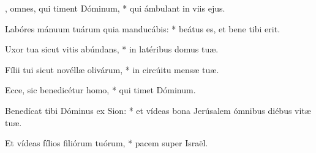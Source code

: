 \begin{psalmus}

, omnes, qui timent Dóminum, * qui ámbulant in viis ejus.

Labóres mánuum tuárum quia manducábis: * beátus es, et bene tibi erit.

Uxor tua sicut vitis abúndans, * in latéribus domus tuæ.

Fílii tui sicut novéllæ olivárum, * in circúitu mensæ tuæ.

Ecce, sic benedicétur homo, * qui timet Dóminum.

Benedícat tibi Dóminus ex Sion: * et vídeas bona Jerúsalem ómnibus diébus vitæ tuæ.

Et vídeas fílios filiórum tuórum, * pacem super Israël.

\end{psalmus}
